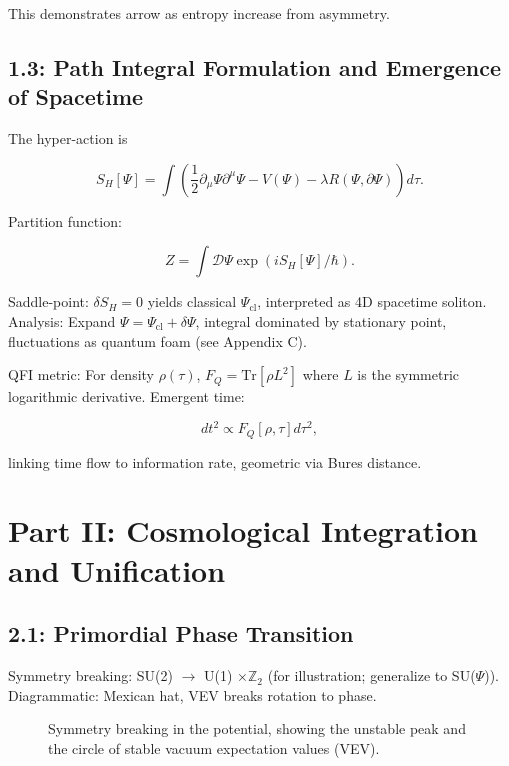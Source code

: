 \documentclass[12pt]{article}
\newcommand{\cl}{\mathrm{cl}}   %
\theoremstyle{definition}
\begin{document}
This demonstrates arrow as entropy increase from asymmetry.

\subsection{1.3: Path Integral Formulation and Emergence of Spacetime}

The hyper-action is

\begin{equation}
S_H[\Psi] = \int \left( \frac{1}{2} \partial_\mu \Psi \partial^\mu \Psi - V(\Psi) - \lambda R(\Psi, \partial \Psi) \right) d\tau.
\end{equation}

Partition function:

\begin{equation}
Z = \int \mathcal{D}\Psi \exp(i S_H [\Psi] / \hbar).
\end{equation}

Saddle-point: $\delta S_H = 0$ yields classical $\Psi_{\cl}$, interpreted as 4D spacetime soliton. Analysis: Expand $\Psi = \Psi_{\cl} + \delta \Psi$, integral dominated by stationary point, fluctuations as quantum foam (see Appendix C).

QFI metric: For density $\rho(\tau)$, $F_Q = \text{Tr} [\rho L^2]$ where $L$ is the symmetric logarithmic derivative. Emergent time:

\begin{equation}
dt^2 \propto F_Q [\rho, \tau] d \tau^2,
\end{equation}

linking time flow to information rate, geometric via Bures distance.

\section{Part II: Cosmological Integration and Unification}

\subsection{2.1: Primordial Phase Transition}

Symmetry breaking: SU(2) $\to$ U(1) $\times \mathbb{Z}_2$ (for illustration; generalize to SU($\Psi$)). Diagrammatic: Mexican hat, VEV breaks rotation to phase.

\begin{figure}[htbp]
\centering
{}
\caption{Symmetry breaking in the potential, showing the unstable peak and the circle of stable vacuum expectation values (VEV).}
\label{fig:symmetry_breaking}
\end{figure}
\end{document}
